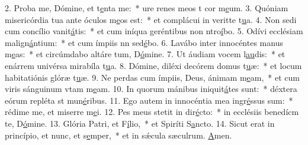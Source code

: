 2. Proba me, Dómine, et t\uline{e}nta me:~* ure renes meos t cor m\uline{e}um.
3. Quóniam misericórdia tua ante óculos m\uline{e}os est:~* et complácui in veritte t\uline{u}a.
4. Non sedi cum concílio vanit\uline{á}tis:~* et cum iníqua geréntibus non ntro\uline{í}bo.
5. Odívi ecclésiam malign\uline{á}ntium:~* et cum ímpiis nn sed\uline{é}bo.
6. Lavábo inter innocéntes manus m\uline{e}as:~* et circúmdabo altáre tum, D\uline{ó}mine.
7. Ut áudiam vocem l\uline{au}dis:~* et enárrem univérsa mirabíla t\uline{u}a.
8. Dómine, diléxi decórem domus t\uline{u}æ:~* et locum habitatiónis glóræ t\uline{u}æ.
9. Ne perdas cum ímpiis, Deus, ánimam m\uline{e}am,~* et cum viris sánguinum vtam m\uline{e}am.
10. In quorum mánibus iniquit\uline{á}tes sunt:~* déxtera eórum repléta st mun\uline{é}ribus.
11. Ego autem in innocéntia mea ingr\uline{é}ssus sum:~* rédime me, et miserre m\uline{e}i.
12. Pes meus stetit in dir\uline{é}cto:~* in ecclésiis benedícm te, D\uline{ó}mine.
13. Glória Patri, et F\uline{í}lio,~* et Spiríti S\uline{a}ncto.
14. Sicut erat in princípio, et nunc, et s\uline{e}mper,~* et in sǽcula sæculrum. \uline{A}men.
